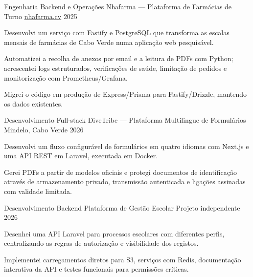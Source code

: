 
\begin{cventries}
  \cventry
    {Engenharia Backend e Operações}
    {Nhafarma — Plataforma de Farmácias de Turno}
    {\href{https://nhafarma.cv}{nhafarma.cv}}
    {2025}
    {
      \begin{cvitems}
        \item {Desenvolvi um serviço com Fastify e PostgreSQL que transforma as escalas mensais de farmácias de Cabo Verde numa aplicação web pesquisável.}
        \item {Automatizei a recolha de anexos por email e a leitura de PDFs com Python; acrescentei logs estruturados, verificações de saúde, limitação de pedidos e monitorização com Prometheus/Grafana.}
        \item {Migrei o código em produção de Express/Prisma para Fastify/Drizzle, mantendo os dados existentes.}
      \end{cvitems}
    }

  \cventry
    {Desenvolvimento Full-stack}
    {DiveTribe — Plataforma Multilingue de Formulários}
    {Mindelo, Cabo Verde}
    {2026}
    {
      \begin{cvitems}
        \item {Desenvolvi um fluxo configurável de formulários em quatro idiomas com Next.js e uma API REST em Laravel, executada em Docker.}
        \item {Gerei PDFs a partir de modelos oficiais e protegi documentos de identificação através de armazenamento privado, transmissão autenticada e ligações assinadas com validade limitada.}
      \end{cvitems}
    }

  \cventry
    {Desenvolvimento Backend}
    {Plataforma de Gestão Escolar}
    {Projeto independente}
    {2026}
    {
      \begin{cvitems}
        \item {Desenhei uma API Laravel para processos escolares com diferentes perfis, centralizando as regras de autorização e visibilidade dos registos.}
        \item {Implementei carregamentos diretos para S3, serviços com Redis, documentação interativa da API e testes funcionais para permissões críticas.}
      \end{cvitems}
    }
\end{cventries}
